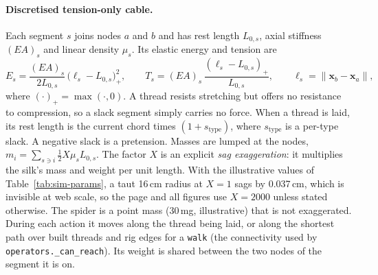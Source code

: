 \paragraph{Discretised tension-only cable.}
Each segment $s$ joins nodes $a$ and $b$ and has rest length $L_{0,s}$, axial stiffness $(EA)_s$ and linear density
$\mu_s$. Its elastic energy and tension are
\begin{equation}
  E_s = \frac{(EA)_s}{2L_{0,s}}\,\bigl(\ell_s - L_{0,s}\bigr)_+^2, \qquad
  T_s = (EA)_s\,\frac{(\ell_s - L_{0,s})_+}{L_{0,s}}, \qquad \ell_s = \lVert \mathbf{x}_b - \mathbf{x}_a \rVert ,
  \label{eq:sim-cable}
\end{equation}
where $(\cdot)_+ = \max(\cdot,0)$. A thread resists stretching but offers no resistance to compression, so a slack
segment simply carries no force. When a thread is laid, its rest length is the current chord times $(1+s_{\text{type}})$,
where $s_{\text{type}}$ is a per-type slack. A negative slack is a pretension. Masses are lumped at the nodes,
$m_i = \sum_{s\ni i} \tfrac12 X \mu_s L_{0,s}$. The factor $X$ is an explicit \emph{sag exaggeration}: it multiplies
the silk's mass and weight per unit length. With the illustrative values of Table~\ref{tab:sim-params}, a taut 16\,cm
radius at $X=1$ sags by 0.037\,cm, which is invisible at web scale, so the page and all figures use $X=2000$ unless
stated otherwise. The spider is a point mass (30\,mg, illustrative) that is not exaggerated. During each action it
moves along the thread being laid, or along the shortest path over built threads and rig edges for a \texttt{walk}
(the connectivity used by \texttt{operators.\_can\_reach}). Its weight is shared between the two nodes of the segment
it is on.

